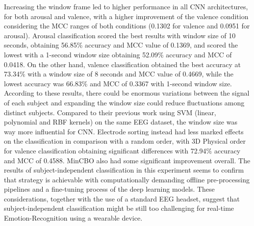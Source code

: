 Increasing the window frame led to higher performance in all \ac{CNN} architectures, for both arousal and valence, with a higher improvement of the valence condition considering the \ac{MCC} ranges of both conditions (0.1302 for valence and 0.0951 for arousal). Arousal classification scored the best results with window size of 10 seconds, obtaining 56.85\% accuracy and \ac{MCC} value of 0.1369, and scored the lowest with a 1-second window size obtaining 52.09\% accuracy and \ac{MCC} of 0.0418. On the other hand, valence classification obtained the best accuracy at 73.34\% with a window size of 8 seconds and \ac{MCC} value of 0.4669, while the lowest accuracy was 66.83\% and \ac{MCC} of 0.3367 with 1-second window size. According to these results, there could be enormous variations between the signal of each subject and expanding the window size could reduce fluctuations among distinct subjects. Compared to their previous work using \ac{SVM} (linear, polynomial and RBF kernels) on the same EEG dataset, the window size was way more influential for \ac{CNN}. Electrode sorting instead had less marked effects on the classification in comparison with a random order, with 3D Physical order for valence classification obtaining significant differences with 72.94\% accuracy and \ac{MCC} of 0.4588. MinCBO also had some significant improvement overall. The results of subject-independent classification in this experiment seems to confirm that strategy is achievable with computationally demanding offline pre-processing pipelines and a fine-tuning process of the deep learning models. These considerations, together with the use of a standard \ac{EEG} headset, suggest that subject-independent classification might be still too challenging for real-time Emotion-Recognition using a wearable device. 
\\
\\
